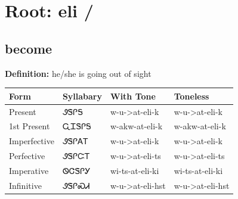 \documentclass{article}%
\begin{document}
%
\normalsize%
\section*{Root: eli / }%
\subsection*{become}%
\textbf{Definition: }%
he/she is going out of sight%
\\[0.5em]%
\begin{tabular}{|l|l|l|l|}%
\hline%
\textbf{Form}&\textbf{Syllabary}&\textbf{With Tone}&\textbf{Toneless}\\%
\hline%
Present&ᏭᏕᎵᎦ&w{-}u{-}>at{-}eli{-}k&w{-}u{-}>at{-}eli{-}k\\%
1st Present&ᏩᏆᏕᎵᎦ&w{-}akw{-}at{-}eli{-}k&w{-}akw{-}at{-}eli{-}k\\%
Imperfective&ᏭᏕᎵᎪᎢ&w{-}u{-}>at{-}eli{-}k&w{-}u{-}>at{-}eli{-}k\\%
Perfective&ᏭᏕᎵᏨᎢ&w{-}u{-}>at{-}eli{-}ts&w{-}u{-}>at{-}eli{-}ts\\%
Imperative&ᏫᏣᏕᎵᎩ&wi{-}ts{-}at{-}eli{-}ki&wi{-}ts{-}at{-}eli{-}ki\\%
Infinitive&ᏭᏕᎵᏍᏗ&w{-}u{-}>at{-}eli{-}hst&w{-}u{-}>at{-}eli{-}hst\\%
\hline%
\end{tabular}%
\\[1em]%
\end{document}
